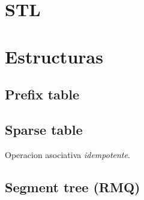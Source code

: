 

\def\title{Notebook (largo)}
\tableofcontents\newpage
 
\section{STL}%



\section{Estructuras}%
\subsection{Prefix table}
\subsection{Sparse table}
Operacion asociativa \emph{idempotente}.
\subsection{Segment tree (RMQ)}
